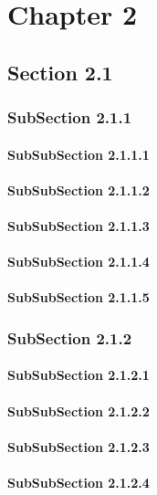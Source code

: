 \cleardoublepage

\chapter{Chapter 2}



\section{Section 2.1}
\subsection{SubSection 2.1.1}
\subsubsection{SubSubSection 2.1.1.1}
\subsubsection{SubSubSection 2.1.1.2}
\subsubsection{SubSubSection 2.1.1.3}
\subsubsection{SubSubSection 2.1.1.4}
\subsubsection{SubSubSection 2.1.1.5}
\subsection{SubSection 2.1.2}
\subsubsection{SubSubSection 2.1.2.1}
\subsubsection{SubSubSection 2.1.2.2}
\subsubsection{SubSubSection 2.1.2.3}
\subsubsection{SubSubSection 2.1.2.4}
